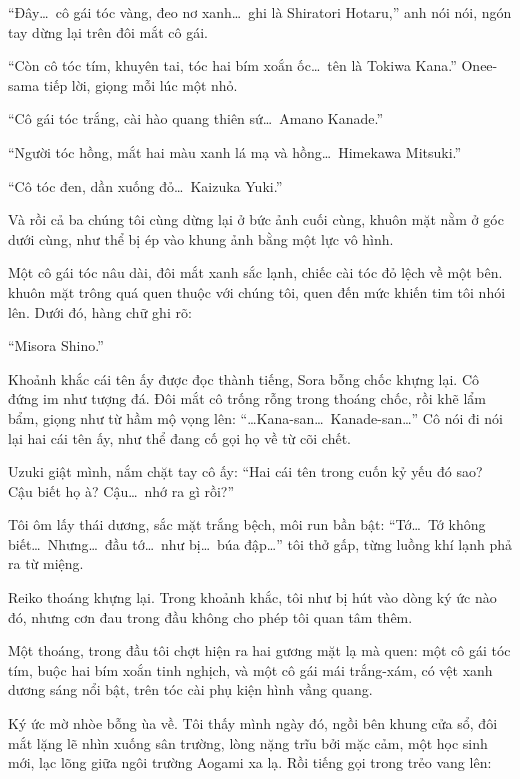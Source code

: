 \documentclass[../main.tex]{subfiles}
\begin{document}
``Đây\dots\ cô gái tóc vàng, đeo nơ xanh\dots\ ghi là Shiratori Hotaru,'' anh nói nói, ngón tay dừng lại trên đôi mắt cô gái.

``Còn cô tóc tím, khuyên tai, tóc hai bím xoắn ốc\dots\ tên là Tokiwa Kana.'' Onee-sama tiếp lời, giọng mỗi lúc một nhỏ.

``Cô gái tóc trắng, cài hào quang thiên sứ\dots\ Amano Kanade.''

``Người tóc hồng, mắt hai màu xanh lá mạ và hồng\dots\ Himekawa Mitsuki.''

``Cô tóc đen, dần xuống đỏ\dots\ Kaizuka Yuki.''

Và rồi cả ba chúng tôi cùng dừng lại ở bức ảnh cuối cùng, khuôn mặt nằm ở góc dưới cùng, như thể bị ép vào khung ảnh bằng một lực vô hình.

Một cô gái tóc nâu dài, đôi mắt xanh sắc lạnh, chiếc cài tóc đỏ lệch về một bên. khuôn mặt trông quá quen thuộc với chúng tôi, quen đến mức khiến tim tôi nhói lên. Dưới đó, hàng chữ ghi rõ:

``Misora Shino.''


Khoảnh khắc cái tên ấy được đọc thành tiếng, Sora bỗng chốc khựng lại. Cô đứng im như tượng đá. Đôi mắt cô trống rỗng trong thoáng chốc, rồi khẽ lẩm bẩm, giọng như từ hầm mộ vọng lên: ``\dots Kana-san\dots\ Kanade-san\dots'' Cô nói đi nói lại hai cái tên ấy, như thể đang cố gọi họ về từ cõi chết.

Uzuki giật mình, nắm chặt tay cô ấy: ``Hai cái tên trong cuốn kỷ yếu đó sao? Cậu biết họ à? Cậu\dots\ nhớ ra gì rồi?''


Tôi ôm lấy thái dương, sắc mặt trắng bệch, môi run bần bật: ``Tớ\dots\ Tớ không biết\dots\ Nhưng\dots\ đầu tớ\dots\ như bị\dots\ búa đập\dots'' tôi thở gấp, từng luồng khí lạnh phả ra từ miệng.

Reiko thoáng khựng lại. Trong khoảnh khắc, tôi như bị hút vào dòng ký ức nào đó, nhưng cơn đau trong đầu không cho phép tôi quan tâm thêm.

Một thoáng, trong đầu tôi chợt hiện ra hai gương mặt lạ mà quen: một cô gái tóc tím, buộc hai bím xoắn tinh nghịch, và một cô gái mái trắng-xám, có vệt xanh dương sáng nổi bật, trên tóc cài phụ kiện hình vầng quang.

Ký ức mờ nhòe bỗng ùa về. Tôi thấy mình ngày đó, ngồi bên khung cửa sổ, đôi mắt lặng lẽ nhìn xuống sân trường, lòng nặng trĩu bởi mặc cảm, một học sinh mới, lạc lõng giữa ngôi trường Aogami xa lạ. Rồi tiếng gọi trong trẻo vang lên:
\end{document}
